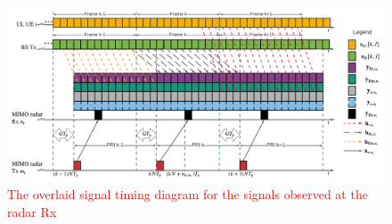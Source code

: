 \documentclass[10pt,journal]{IEEEtran}
\newcommand{\ith}[1]    {{#1}^{\underline{\text{th}}}}
\theoremstyle{definition}
\begin{document}
\begin{figure}[!t]
	\centering
	\includegraphics[width=1.0\columnwidth]{Timing_diagram_radar.png}
	\caption{\textcolor{red}{The overlaid signal timing diagram for the  signals observed at the radar Rx }
	} 
	\label{fig:systemmodel}
\end{figure}





\color{black}
\end{document}
